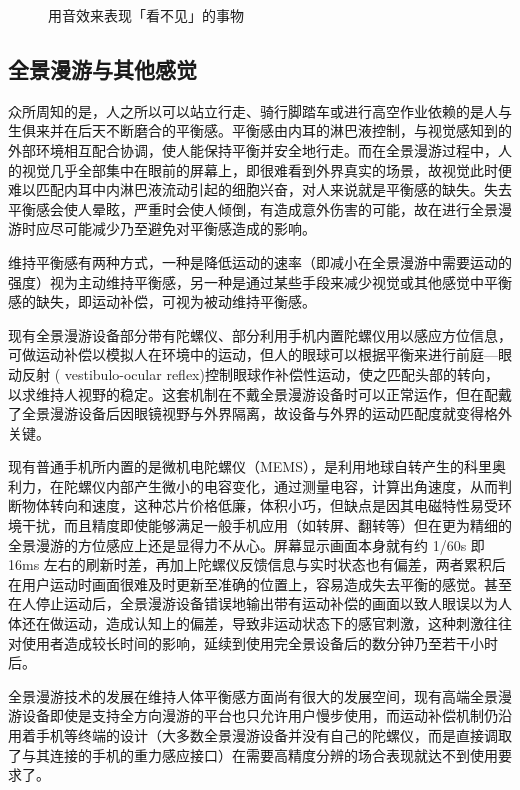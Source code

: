 \begin{figure}[htp]
\centering
{}
\caption{用音效来表现「看不见」的事物}
\label{fig:audio-source}
\end{figure}

\subsection{全景漫游与其他感觉}
众所周知的是，人之所以可以站立行走、骑行脚踏车或进行高空作业依赖的是人与生俱来并在后天不断磨合的平衡感。平衡感由内耳的淋巴液控制，与视觉感知到的外部环境相互配合协调，使人能保持平衡并安全地行走。而在全景漫游过程中，人的视觉几乎全部集中在眼前的屏幕上，即很难看到外界真实的场景，故视觉此时便难以匹配内耳中内淋巴液流动引起的细胞兴奋，对人来说就是平衡感的缺失。失去平衡感会使人晕眩，严重时会使人倾倒，有造成意外伤害的可能，故在进行全景漫游时应尽可能减少乃至避免对平衡感造成的影响。

维持平衡感有两种方式，一种是降低运动的速率（即减小在全景漫游中需要运动的强度）视为主动维持平衡感，另一种是通过某些手段来减少视觉或其他感觉中平衡感的缺失，即运动补偿，可视为被动维持平衡感。

现有全景漫游设备部分带有陀螺仪、部分利用手机内置陀螺仪用以感应方位信息，可做运动补偿以模拟人在环境中的运动，但人的眼球可以根据平衡来进行前庭—眼动反射 ( vestibulo-ocular reflex)控制眼球作补偿性运动，使之匹配头部的转向，以求维持人视野的稳定。这套机制在不戴全景漫游设备时可以正常运作，但在配戴了全景漫游设备后因眼镜视野与外界隔离，故设备与外界的运动匹配度就变得格外关键。

现有普通手机所内置的是微机电陀螺仪（MEMS），是利用地球自转产生的科里奥利力，在陀螺仪内部产生微小的电容变化，通过测量电容，计算出角速度，从而判断物体转向和速度，这种芯片价格低廉，体积小巧，但缺点是因其电磁特性易受环境干扰，而且精度即使能够满足一般手机应用（如转屏、翻转等）但在更为精细的全景漫游的方位感应上还是显得力不从心。屏幕显示画面本身就有约 1/60s 即 16ms 左右的刷新时差，再加上陀螺仪反馈信息与实时状态也有偏差，两者累积后在用户运动时画面很难及时更新至准确的位置上，容易造成失去平衡的感觉。甚至在人停止运动后，全景漫游设备错误地输出带有运动补偿的画面以致人眼误以为人体还在做运动，造成认知上的偏差，导致非运动状态下的感官刺激，这种刺激往往对使用者造成较长时间的影响，延续到使用完全景设备后的数分钟乃至若干小时后。

全景漫游技术的发展在维持人体平衡感方面尚有很大的发展空间，现有高端全景漫游设备即使是支持全方向漫游的平台也只允许用户慢步使用，而运动补偿机制仍沿用着手机等终端的设计（大多数全景漫游设备并没有自己的陀螺仪，而是直接调取了与其连接的手机的重力感应接口）在需要高精度分辨的场合表现就达不到使用要求了。

